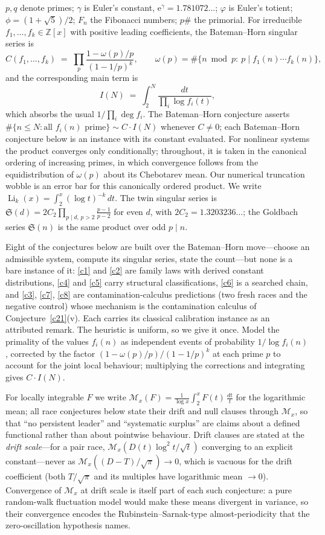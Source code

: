 \documentclass[11pt]{article}
\theoremstyle{definition}
\newcommand{\Li}{\operatorname{Li}}
\newcommand{\e}{\mathrm{e}}
\newcommand{\SG}{\mathfrak S}
\newcommand{\M}{\mathcal M}
\begin{document}
$p,q$ denote primes; $\gamma$ is Euler's constant,
$\e^{\gamma}=1.781072\ldots$; $\varphi$ is Euler's totient;
$\phi=(1+\sqrt5)/2$; $F_n$ the Fibonacci numbers; $p\#$ the primorial.
For irreducible $f_1,\dots,f_k\in\mathbb Z[x]$ with positive leading
coefficients, the Bateman--Horn singular series is
\[
  C(f_1,\dots,f_k)\;=\;\prod_{p}\frac{1-\omega(p)/p}{(1-1/p)^{k}},
  \qquad
  \omega(p)=\#\{n \bmod p:\ p\mid f_1(n)\cdots f_k(n)\},
\]
and the corresponding main term is
\[
  I(N)\;=\;\int_{2}^{N}\frac{dt}{\prod_{i}\log f_i(t)},
\]
which absorbs the usual $1/\prod_i \deg f_i$.  The Bateman--Horn
conjecture \cite{BH} asserts
$\#\{n\le N: \text{all } f_i(n) \text{ prime}\}\sim C\cdot I(N)$
whenever $C\neq0$; each Bateman--Horn conjecture below is an instance
with its constant evaluated.  For nonlinear systems the product
converges only conditionally; throughout, it is taken in the canonical
ordering of increasing primes, in which convergence follows from the
equidistribution of $\omega(p)$ about its Chebotarev mean.  Our
numerical truncation wobble is an error bar for this canonically
ordered product.  We write
$\Li_k(x)=\int_2^x(\log t)^{-k}\,dt$.  The twin singular series is
$\SG(d)=2C_2\prod_{p\mid d,\,p>2}\frac{p-1}{p-2}$ for even $d$, with
$2C_2=1.3203236\ldots$; the Goldbach series $\SG(n)$ is the same product
over odd $p\mid n$.

Eight of the conjectures below are built over the Bateman--Horn
move---choose an admissible system, compute its singular series,
state the count---but none is a bare instance of it:
\ref{c1} and \ref{c2} are family laws with derived constant
distributions, \ref{c4} and \ref{c5} carry structural classifications,
\ref{c6} is a searched chain, and \ref{c3}, \ref{c7}, \ref{c8} are
contamination-calculus predictions (two fresh races and the negative
control) whose mechanism is the contamination calculus of
Conjecture~\ref{c21}(v).  Each carries
its classical calibration instance as an attributed remark.
The heuristic is uniform, so we give it once.  Model the primality of the
values $f_i(n)$ as independent events
of probability $1/\log f_i(n)$, corrected by the factor
$(1-\omega(p)/p)/(1-1/p)^k$ at each prime $p$ to account for the joint
local behaviour; multiplying the corrections and integrating gives
$C\cdot I(N)$.

For locally integrable $F$ we write
$\M_x(F)=\frac1{\log x}\int_2^x F(t)\,\frac{dt}t$ for the logarithmic
mean; all race conjectures below state their drift and null clauses
through $\M_x$, so that ``no persistent leader'' and ``systematic
surplus'' are claims about a defined functional rather than about
pointwise behaviour.  Drift clauses are stated at the \emph{drift
scale}---for a pair race, $\M_x(D(t)\log^2t/\sqrt t)$ converging to
an explicit constant---never as
$\M_x((D-T)/\sqrt\pi)\to0$, which is vacuous for the drift coefficient
(both $T/\sqrt\pi$ and its multiples have logarithmic mean $\to0$).
Convergence of $\M_x$ at
drift scale is itself part of each such conjecture: a pure
random-walk fluctuation model would make these means divergent in
variance, so their convergence encodes the Rubinstein--Sarnak-type
almost-periodicity that the zero-oscillation hypothesis names.
\end{document}
